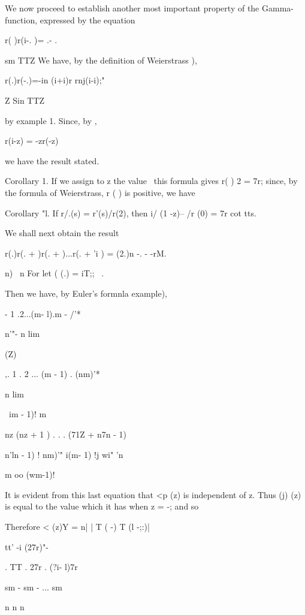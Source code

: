 
We now proceed to establish another most important property of the
Gamma-function, expressed by the equation

r( )r(i-. )= .- .

sm TTZ We have, by the definition of Weierstrass ),

r(.)r(-.)=-in (i+i)r rnj(i-i);"

Z Sin TTZ

by  example 1. Since, by ,

r(i-z) = -zr(-z)

we have the result stated.

%
%

Corollary 1. If we assign to z the value \, this formula gives r( ) 2
= 7r; since, by the formula of Weierstrass, r ( ) is positive, we
have

Corollary "l. If r/.(s) = r'(s)/r(2), then i/ (1 -z)-- /r (0) = 7r cot
tts.

We shall next obtain the result

r(.)r(. + )r(. + )...r(. + 'i ) = (2.)n -. - -rM.

n) \ n For let ( (.) = iT;; \ .

Then we have, by Euler's formnla  example),

 - 1 .2...(m- l).m - /'*

n'"- n lim

 (Z)

,. 1 . 2 ... (m - 1) . (nm)'*

n lim

\ im - 1)! m

nz (nz + 1 ) . . . (71Z + n7n - 1)

 n'ln - 1) ! nm)'" i(m- 1) !j wi" 'n

m oo (wm-1)!

It is evident from this last equation that <p (z) is independent of z.
Thus (j) (z) is equal to the value which it has when z = -; and so

Therefore < (z)Y = n| | T ( -) T (l -;:)|

tt' -i (27r)"-

. TT . 27r . (?i- l)7r

sm - sm - ... sm

n n n

